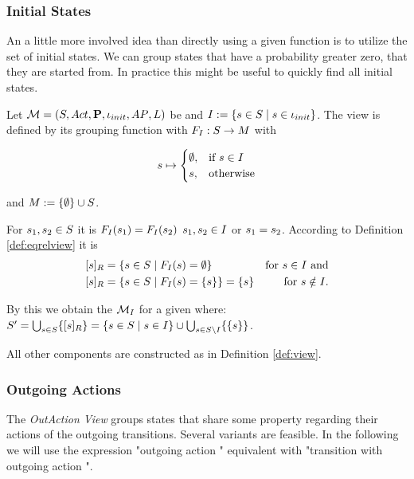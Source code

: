 \documentclass[preview]{standalone}
\begin{document}

\subsubsection{Initial States}
An a little more involved idea than directly using a given function is to utilize the set of initial states. We can group states that have a probability greater zero, that they are started from. In practice this might be useful to quickly find all initial states.

\begin{definition}
	Let ${{{\mathcal{M}}}} = {{({S}, {Act}, {\textbf{P}}, {\iota_{init}}, {AP}, {L})}}$ be \chosengraphtypeN and ${I} := \{{s} \in {S} \mid {s} \in {\ensuremath{{\iota_{init}}}}\}$. The view \viewinitstates is defined by its grouping function \gfctinitstates \grpfctN with ${{F_{{I}}}} : {S} \to {\ensuremath{{M}}}$ with 
	
	\[
	{s} \mapsto
	\begin{cases}
		\emptyset,				& \text{if } {s} \in {I} \\
		{{s}},          	& \text{otherwise}
	\end{cases}
	\]
	
	and ${{M}} := \{\emptyset\} \cup {\ensuremath{{S}}}$.
\end{definition}

For ${s}_1,{s}_2 \in {S}$ it is ${{F_{{I}}}}({s}_1) = {{F_{{I}}}}({s}_2)$ \iffN ${s}_1, {s}_2 \in {I}$ or ${s}_1 = {s}_2$. According to Definition \ref{def:eqrelview} it is 
\begin{align*}
	{\ensuremath{{[{s}]_{{R}}}}} &= \{{s} \in {S} \mid {\ensuremath{{F_{{I}}}}}({s}) = \emptyset\} &\text{for } {s} \in {I} \text{ and} \\
	{{[{s}]_{{R}}}} &= \{{s} \in {S} \mid {\ensuremath{{F_{{I}}}}}({s}) = \{{s}\} \} = \{{s}\} &\text{for } {s} \notin {I}.
\end{align*}


By this we obtain the \viewN ${{{{{\mathcal{M}}}}_{{I}}}}$ for a given \chosengraphtypeN \chgph where: ${S}' = \bigcup_{{s} \in {S}} \{{{[{s}]_{{R}}}}\} = \{{s} \in {S} \mid {s} \in {I}\}\cup \bigcup_{{s} \in {S} \setminus {I}}\{\{{s}\}\}$.

All other components are constructed as in Definition \ref{def:view}.

\subsubsection{Outgoing Actions}
The \emph{OutAction View} groups states that share some property regarding their actions  of the outgoing transitions. Several variants are feasible. In the following we will use the expression "outgoing action \action" equivalent with "transition with outgoing action \action".
\end{document}

